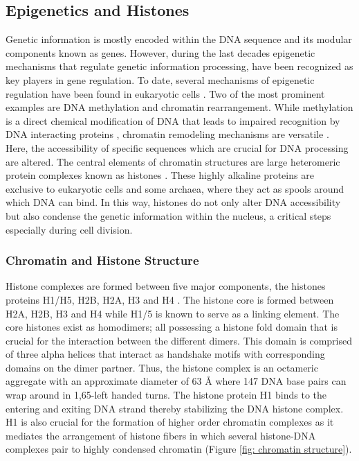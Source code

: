 \documentclass{article}
\begin{document}
\subsection{Epigenetics and Histones}\label{sec: Epigenetics and Histones}
Genetic information is mostly encoded within the DNA sequence and its modular components known as genes. However, during the last decades epigenetic mechanisms that regulate genetic information processing, have been recognized as key players in gene regulation. To date, several mechanisms of epigenetic regulation have been found in eukaryotic cells \cite{bird2007perceptions}. Two of the most prominent examples are DNA methylation and chromatin rearrangement.  While methylation is a direct chemical modification of DNA that leads to impaired recognition by DNA interacting proteins \cite{cuozzo2007dna}, chromatin remodeling mechanisms are versatile \cite{jenuwein1998set,gottschalk2009poly,lin2007role}. Here, the accessibility of specific sequences which are crucial for DNA processing are altered. The central elements of chromatin structures are large heteromeric protein complexes known as histones \cite{marino2005histone}. These highly alkaline proteins are exclusive to eukaryotic cells and some archaea, where they act as spools around which DNA can bind.  In this way, histones do not only alter DNA accessibility but also condense the genetic information within the nucleus, a critical steps especially during cell division. 

\subsubsection{Chromatin and Histone Structure}\label{sec: Chromatin and Histone Structure}
Histone complexes are formed between five major components, the histones proteins H1/H5, H2B, H2A, H3 and H4 \cite{marino2005histone}. The histone core is formed between H2A, H2B, H3 and H4 while H1/5 is known to serve as a linking element. The core histones exist as homodimers; all possessing a histone fold domain that is crucial for the interaction between the different dimers. This domain is comprised of three alpha helices that interact as handshake motifs with corresponding domains on the dimer partner. Thus, the histone complex is an octameric aggregate with an approximate diameter of 63 Å where 147 DNA base pairs can wrap around in 1,65-left handed turns. The histone protein H1 binds to the entering and exiting DNA strand thereby stabilizing the DNA histone complex. H1 is also crucial for the formation of higher order chromatin complexes as it mediates the arrangement of histone fibers in which several histone-DNA complexes pair to highly condensed chromatin (Figure \ref{fig: chromatin structure}). 
\end{document}
